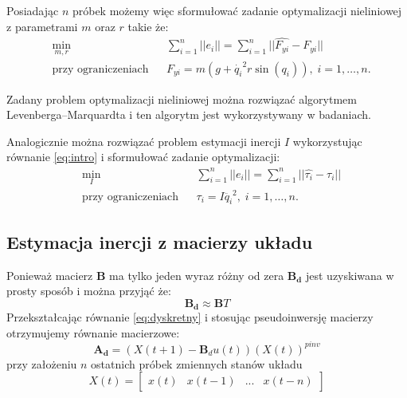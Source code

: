 \documentclass[a4paper, 10pt]{article}
\begin{document}
Posiadając $n$ próbek możemy więc sformułować zadanie optymalizacji nieliniowej z parametrami $m$ oraz $r$ takie że:
\begin{equation}
\begin{aligned}
& \underset{m, r}{\text{min}}
& & \sum_{i = 1}^{n} || e_i || = \sum_{i = 1}^{n} || \hat{F_{yi}} - F_{yi} || \\
& \text{przy ograniczeniach}
& & F_{yi} = m(g + \dot{q_i}^2r\sin{(q_i)}), \; i = 1, \ldots, n.
\end{aligned}
\end{equation}

Zadany problem optymalizacji nieliniowej można rozwiązać algorytmem Levenberga–Marquardta i ten algorytm jest wykorzystywany w badaniach.

Analogicznie można rozwiązać problem estymacji inercji $I$ wykorzystując równanie \ref{eq:intro} i sformułować zadanie optymalizacji:
\begin{equation}
\begin{aligned}
& \underset{I}{\text{min}}
& & \sum_{i = 1}^{n} || e_i || = \sum_{i = 1}^{n} || \hat{\tau_{i}} - \tau_{i} || \\
& \text{przy ograniczeniach}
& & \tau_{i} = I\ddot{q_i}^2, \; i = 1, \ldots, n.
\end{aligned}
\end{equation}

\subsection{Estymacja inercji z macierzy układu}
\label{sec:pos}
Ponieważ macierz $\mathbf{B}$ ma tylko jeden wyraz różny od zera $\mathbf{B_d}$ jest uzyskiwana w prosty sposób i można przyjąć że:
\begin{equation}
\mathbf{B_d} \approx \mathbf{B}T
\end{equation}
Przekształcając równanie \ref{eq:dyskretny} i stosując pseudoinwersję macierzy otrzymujemy równanie macierzowe:
\begin{equation}
\mathbf{A_d} = (X(t+1) - \mathbf{B}_du(t))(X(t))^{pinv}
\label{eq:pinv}
\end{equation}
przy założeniu $n$ ostatnich próbek zmiennych stanów układu
\begin{equation}
X(t) = 	\begin{bmatrix}
x(t) & x(t-1)  & ... & x(t-n)
\end{bmatrix}
\label{eq:xk}
\end{equation}
\end{document}
